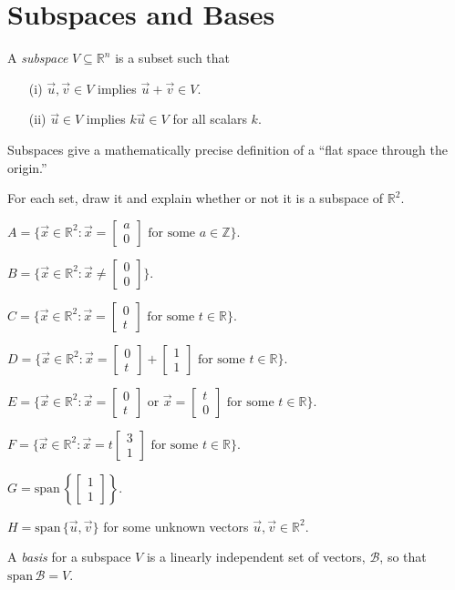 \documentclass{problemset}
\newcommand{\R}{\mathbb{R}}
\newcommand{\Z}{\mathbb{Z}}
\renewcommand{\span}{\mathrm{span}\,}
\newcommand{\Span}{\mathrm{span}\,}
\newcommand{\mat}[1]{\begin{bmatrix}#1\end{bmatrix}}
\begin{document}
\section*{Subspaces and Bases}
	\vspace{-1em}
	\begin{definition}[Subspace]
		A \emph{subspace} $V\subseteq \R^n$ is a subset such that
		\begin{enumerate}
			\item[(i)] $\vec u,\vec v\in V$ implies $\vec u+\vec v\in V$.
			\item[(ii)] $\vec u\in V$ implies $k\vec u\in V$ for all scalars $k$.
		\end{enumerate}
	\end{definition}

	Subspaces give a mathematically precise definition of a ``flat space through the origin.''

	\question
	For each set, draw it and explain whether or not it is a subspace of $\R^2$.
	\begin{parts}
		\item $A=\{\vec x\in\R^2:\vec x=\mat{a\\0}\text{ for some }a\in\Z\}$.
		\item $B=\{\vec x\in\R^2:\vec x\neq \mat{0\\0}\}$.
		\item $C=\{\vec x\in\R^2:\vec x=\mat{0\\t}\text{ for some }t\in\R\}$.
		\item $D=\{\vec x\in\R^2:\vec x=\mat{0\\t}+\mat{1\\1}\text{ for some }t\in\R\}$.
		\item $E=\{\vec x\in\R^2:\vec x=\mat{0\\t}\text{ or }\vec x=\mat{t\\0}\text{ for some }t\in\R\}$.
		\item $F=\{\vec x\in\R^2:\vec x=t\mat{3\\1}\text{ for some }t\in\R\}$.
		\item $G=\span\left\{\mat{1\\1}\right\}$.
		\item $H=\span\{\vec u,\vec v\}$ for some unknown vectors $\vec u,\vec v\in\R^2$.
	\end{parts}

	\begin{definition}[Basis]
		A \emph{basis} for a subspace $V$ is a linearly independent set of vectors, $\mathcal B$,
		so that $\Span\mathcal B=V$.
	\end{definition}
\end{document}

